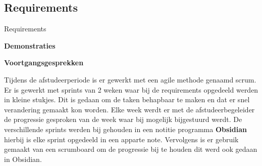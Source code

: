 \subsection{Requirements}
Requirements

\whitespace
\textbf{Demonstraties}

\whitespace
\textbf{Voortgangsgesprekken}

Tijdens de afstudeerperiode is er gewerkt met een agile methode genaamd scrum.
Er is gewerkt met sprints van 2 weken waar bij de requirements opgedeeld werden in kleine stukjes.
Dit is gedaan om de taken behapbaar te maken en dat er snel verandering gemaakt kon worden.
Elke week werdt er met de afstudeerbegeleider de progressie gesproken van de week waar bij mogelijk bijgestuurd werdt.
De verschillende sprints werden bij gehouden in een notitie programma \textbf{Obsidian} hierbij is elke sprint opgedeeld in een apparte note.
Vervolgens is er gebruik gemaakt van een scrumboard om de progressie bij te houden dit werd ook gedaan in Obsidian.
